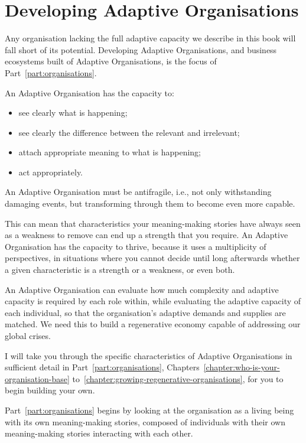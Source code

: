\section{Developing Adaptive Organisations}
Any organisation lacking the full adaptive capacity we describe in this book will fall short of its potential. Developing Adaptive Organisations, and business ecosystems built of Adaptive Organisations, is the focus of Part~\ref{part:organisations}. 


An Adaptive Organisation has the capacity to: 


\begin{itemize}
\item see clearly what is happening;
\item see clearly the difference between the relevant and irrelevant;
\item attach appropriate meaning to what is happening; 
\item act appropriately. 
\end{itemize}


An Adaptive Organisation must be antifragile, i.e., not only withstanding damaging events, but transforming through them to become even more capable\cite{taleb-antifragile}. 


This can mean that characteristics your meaning\hyp{}making stories have always seen as a weakness to remove can end up a strength that you require. An Adaptive Organisation has the capacity to thrive, because it uses a multiplicity of perspectives, in situations where you cannot decide until long afterwards whether a given characteristic is a strength or a weakness, or even both.


An Adaptive Organisation can evaluate how much complexity and adaptive capacity is required by each role within, while evaluating the adaptive capacity of each individual, so that the organisation’s adaptive demands and supplies are matched. We need this to build a regenerative economy capable of addressing our global crises.


I will take you through the specific characteristics of Adaptive Organisations in sufficient detail in Part~\ref{part:organisations}, Chapters~\ref{chapter:who-is-your-organisation-base} to~\ref{chapter:growing-regenerative-organisations}, for you to begin building your own. 


Part~\ref{part:organisations} begins by looking at the organisation as a living being with its own meaning\hyp{}making stories, composed of individuals with their own meaning\hyp{}making stories interacting with each other. 


